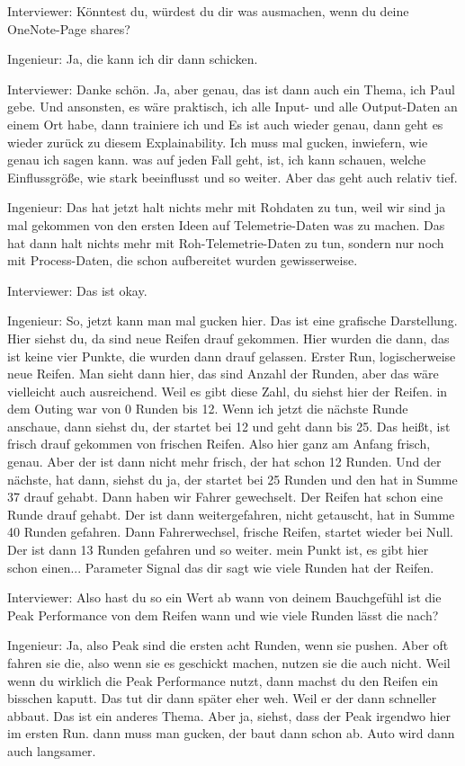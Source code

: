Interviewer:
Könntest du, würdest du dir was ausmachen, wenn du  deine OneNote-Page shares? 

Ingenieur:
Ja, die kann ich dir dann schicken. 

Interviewer: 
Danke schön.  Ja, aber genau, das ist dann auch ein Thema, ich Paul gebe. Und ansonsten, es wäre praktisch,  ich alle Input- und alle Output-Daten an einem Ort habe, dann trainiere ich und Es ist auch wieder genau, dann geht es wieder zurück zu diesem Explainability.  Ich muss mal gucken, inwiefern, wie genau ich sagen kann. was auf jeden Fall geht, ist, ich kann schauen, welche Einflussgröße, wie stark beeinflusst und so weiter. Aber das geht auch relativ tief. 

Ingenieur:
Das hat jetzt halt nichts mehr mit Rohdaten zu tun, weil wir sind ja mal gekommen von den ersten Ideen auf Telemetrie-Daten was zu machen. Das hat dann halt nichts mehr mit Roh-Telemetrie-Daten zu tun, sondern nur noch mit Process-Daten, die schon aufbereitet wurden gewisserweise. 

Interviewer:
Das ist okay. 

Ingenieur:
So, jetzt kann man mal gucken hier. Das ist eine grafische Darstellung. Hier siehst du, da sind neue Reifen drauf gekommen.  Hier wurden die dann, das ist keine vier Punkte, die wurden dann drauf gelassen. Erster Run, logischerweise neue Reifen. Man sieht dann hier, das sind Anzahl der Runden, aber das wäre vielleicht auch ausreichend. Weil es gibt diese Zahl, du siehst hier der Reifen.  in dem Outing war von 0 Runden bis 12. Wenn ich jetzt die nächste Runde anschaue, dann siehst du, der startet bei 12 und geht dann bis 25. Das heißt, ist frisch drauf gekommen von frischen Reifen. Also hier ganz am Anfang frisch, genau. Aber der ist dann nicht mehr frisch, der hat schon 12 Runden. Und der nächste, hat dann, siehst du ja, der startet bei 25 Runden und den hat in Summe 37 drauf gehabt. Dann haben wir Fahrer gewechselt. Der Reifen hat schon eine Runde drauf gehabt. Der ist dann weitergefahren, nicht getauscht, hat in Summe 40 Runden gefahren. Dann Fahrerwechsel, frische Reifen, startet wieder bei Null. Der ist dann 13 Runden gefahren und so weiter. mein Punkt ist, es gibt hier schon einen...  Parameter Signal das dir sagt wie viele Runden hat der Reifen. 


Interviewer:
Also hast du so ein Wert ab wann von deinem Bauchgefühl ist die Peak Performance von dem Reifen wann und wie viele Runden lässt die nach? 

Ingenieur:
Ja, also Peak sind die ersten acht Runden, wenn sie pushen. Aber oft fahren sie die, also wenn sie es geschickt machen, nutzen sie die auch nicht. Weil wenn du wirklich die Peak Performance nutzt, dann machst du den Reifen ein bisschen kaputt. Das tut dir dann später eher weh. Weil er der dann schneller abbaut. Das ist ein anderes Thema. Aber ja, siehst, dass der Peak irgendwo hier im ersten Run. dann muss man gucken, der baut dann schon ab. Auto wird dann auch langsamer.


